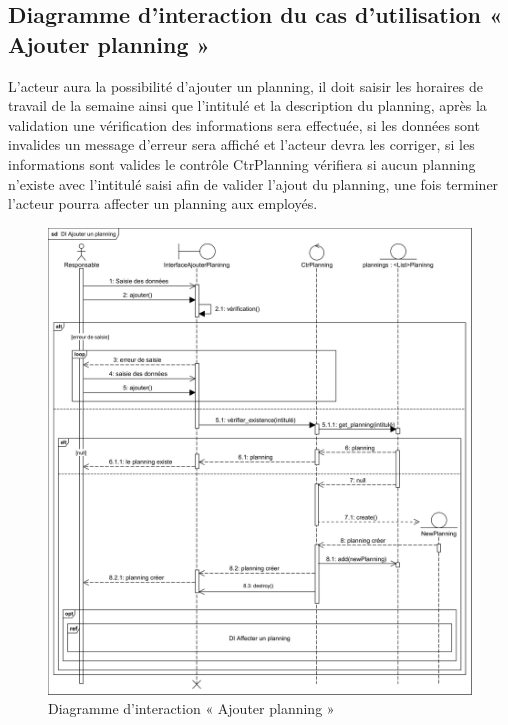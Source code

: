 \begin{itemize}
        \subsection*{Diagramme d'interaction du cas d'utilisation « Ajouter planning »}
        L’acteur aura la possibilité d’ajouter un planning, il doit saisir les horaires de travail de la semaine ainsi que l’intitulé et la description du planning, après la validation une vérification des informations sera effectuée, si les données sont invalides un message d’erreur sera affiché et l’acteur devra les corriger, si les informations sont valides le contrôle CtrPlanning vérifiera si aucun planning n’existe avec l’intitulé saisi afin de valider l’ajout du planning, une fois terminer l’acteur pourra affecter un planning aux employés.
        \clearpage
        \begin{figure}[h!]
                 \centering
                \includegraphics[scale=0.74]{images/DS/DI Ajouter un planning.png}
                 \caption{Diagramme d'interaction « Ajouter planning »}
                 \label{fig39}
        \end{figure}
        
        


\end{itemize}
